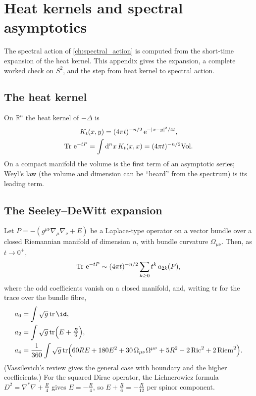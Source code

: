 \chapter{Heat kernels and spectral asymptotics}\label{app:heat}
The spectral action of \cref{ch:spectral_action} is computed from the short-time expansion of the heat kernel. This appendix gives the expansion, a complete worked check on $S^2$, and the step from heat kernel to spectral action.

\section{The heat kernel}
On $\mathbb R^n$ the heat kernel of $-\Delta$ is
\begin{equation}
\begin{gathered}[b]K_t(x,y)=(4\pi t)^{-n/2}\,\mathrm{e}^{-|x-y|^2/4t},\\ \operatorname{Tr}\,\mathrm{e}^{-tP}=\int\mathrm{d}^nx\,K_t(x,x)=(4\pi t)^{-n/2}\mathrm{Vol}.\end{gathered}
\end{equation}
On a compact manifold the volume is the first term of an asymptotic series; Weyl's law (the volume and dimension can be ``heard'' from the spectrum) is its leading term.

\section{The Seeley--DeWitt expansion}
Let $P=-(g^{\mu\nu}\nabla_\mu\nabla_\nu+E)$ be a Laplace-type operator on a vector bundle over a closed Riemannian manifold of dimension $n$, with bundle curvature $\Omega_{\mu\nu}$. Then, as $t\to0^+$,
\begin{equation}
\operatorname{Tr}\,\mathrm{e}^{-tP}\sim(4\pi t)^{-n/2}\sum_{k\ge0}t^{k}\,a_{2k}(P),
\end{equation}
where the odd coefficients vanish on a closed manifold, and, writing $\mathrm{tr}$ for the trace over the bundle fibre,
\begin{align}
a_0&=\int\sqrt g\,\mathrm{tr}\,\id,\\
a_2&=\int\sqrt g\,\mathrm{tr}\Big(E+\tfrac R6\Big),\\
a_4&=\frac1{360}\int\sqrt g\,\mathrm{tr}\Big(60RE+180E^2+30\,\Omega_{\mu\nu}\Omega^{\mu\nu}+5R^2-2\,\mathrm{Ric}^2+2\,\mathrm{Riem}^2\Big).
\end{align}
(Vassilevich's review gives the general case with boundary and the higher coefficients.) For the squared Dirac operator, the Lichnerowicz formula $D^2=\nabla^*\nabla+\tfrac R4$ gives $E=-\tfrac R4$, so $E+\tfrac R6=-\tfrac R{12}$ per spinor component.


